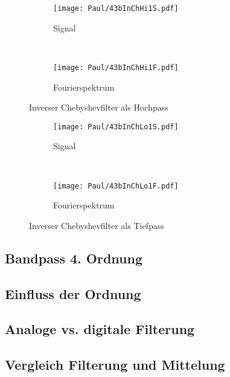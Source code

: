 \newpage
\begin{figure}[h]
    \centering
    \begin{subfigure}{\textwidth}
        \centering
        \texttt{[image: Paul/43bInChHi1S.pdf]}
        \caption{Signal}
    \end{subfigure}\\
    \begin{subfigure}{\textwidth}
        \centering
        \texttt{[image: Paul/43bInChHi1F.pdf]}
        \caption{Fourierspektrum}
    \end{subfigure}
    \caption{Inverser Chebyshevfilter als Hochpass}
\end{figure}


\newpage
\begin{figure}[h]
    \centering
    \begin{subfigure}{\textwidth}
        \centering
        \texttt{[image: Paul/43bInChLo1S.pdf]}
        \caption{Signal}
    \end{subfigure}\\
    \begin{subfigure}{\textwidth}
        \centering
        \texttt{[image: Paul/43bInChLo1F.pdf]}
        \caption{Fourierspektrum}
    \end{subfigure}
    \caption{Inverser Chebyshevfilter als Tiefpass}
\end{figure}

\newpage
\subsection{Bandpass 4. Ordnung}


\subsection{Einfluss der Ordnung}


\subsection{Analoge vs. digitale Filterung}


\subsection{Vergleich Filterung und Mittelung}